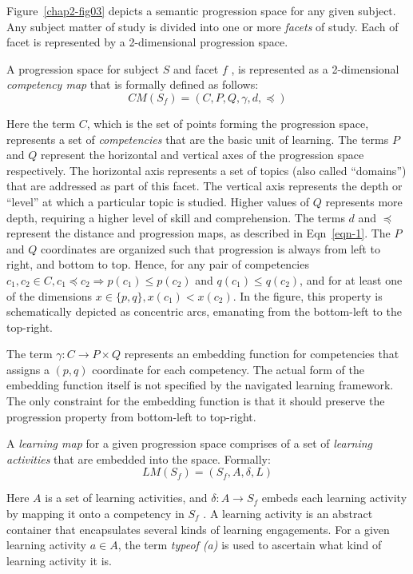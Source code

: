 \begin{multicols}{2}
Figure~\ref{chap2-fig03} depicts a semantic progression space for any given subject. Any subject matter of study is divided into one or more \textit{facets} of study. Each of facet is represented by a 2-dimensional progression space.

A progression space for subject $S$ and facet $f$ , is represented as a 2-dimensional \textit{competency map} that is formally defined as follows:
\begin{equation}
CM(S_f)=(C, P, Q ,\gamma , d,\preceq)\label{eqn-2}
\end{equation}

Here the term $C$, which is the set of points forming the progression space, represents a set of \textit{competencies} that are the basic unit of learning. The terms $P$ and $Q$ represent the horizontal and vertical axes of the progression space respectively. The horizontal axis represents a set of topics (also called “domains”) that are addressed as part of this facet. The vertical axis represents the depth or “level” at which a particular topic is studied. Higher values of $Q$ represents more depth, requiring a higher level of skill and comprehension. The terms $d$ and $\preceq$ represent the distance and progression maps, as described in Eqn~\ref{eqn-1}. The $P$ and $Q$ coordinates are organized such that progression is always from left to right, and bottom to top. Hence, for any pair of competencies $c_1 , c_2 \in C, c_1 \preceq c_2 \Rightarrow p(c_1 )\leq p(c_2 )$ and $q(c_1 ) \leq q(c_2 )$, and for at least one of the dimensions $x \in \{p, q\}, x(c_1 ) < x(c_2 )$. In the figure, this property is schematically depicted as concentric arcs, emanating from the bottom-left to the top-right.

The term $\gamma : C \rightarrow P \times Q$ represents an embedding function for competencies that assigns a $(p, q)$ coordinate for each competency. The actual form of the embedding function itself is not specified by the navigated learning framework. The only constraint for the embedding function is that it should preserve the progression property from bottom-left to top-right.

A \textit{learning map} for a given progression space comprises of a set of \textit{learning activities} that are embedded into the space. Formally:
\begin{equation}
LM(S_f ) = (S_f , A, \delta, L)\label{eqn-3}
\end{equation}

Here $A$ is a set of learning activities, and $\delta : A \rightarrow S_f $ embeds each learning activity by mapping it onto a competency in $S_f$ . A learning activity is an abstract container that encapsulates several kinds of learning engagements. For a given learning activity $a \in A$, the term \textit{typeof (a)} is used to ascertain what kind of learning activity it is.


\end{multicols}
